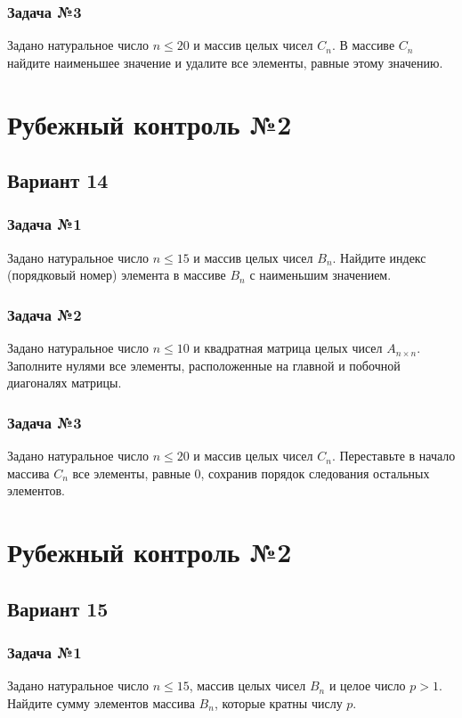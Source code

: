 \documentclass[12pt,a5paper,landscape]{report}
\begin{document}
\subsubsection*{Задача №3}
Задано натуральное число $n \le 20$ и массив целых чисел $C_n$. В массиве $C_n$ найдите наименьшее значение и удалите все элементы, равные этому значению.



\clearpage
\section*{Рубежный контроль №2}
\subsection*{Вариант 14}
\subsubsection*{Задача №1}
Задано натуральное число $n \le 15$ и массив целых чисел $B_n$. Найдите индекс (порядковый номер) элемента в массиве $B_n$ с наименьшим значением.
\subsubsection*{Задача №2}
Задано натуральное число $n \le 10$ и квадратная матрица целых чисел $A_{n \times n}$. Заполните нулями все элементы, расположенные на главной и побочной диагоналях матрицы.
\subsubsection*{Задача №3}
Задано натуральное число $n \le 20$ и массив целых чисел $C_n$. Переставьте в начало массива $C_n$ все элементы, равные $0$, сохранив порядок следования остальных элементов.


\clearpage
\section*{Рубежный контроль №2}
\subsection*{Вариант 15}
\subsubsection*{Задача №1}
Задано натуральное число $n \le 15$, массив целых чисел $B_n$ и целое число $p > 1$. Найдите сумму элементов массива $B_n$, которые кратны числу $p$.
\end{document}
